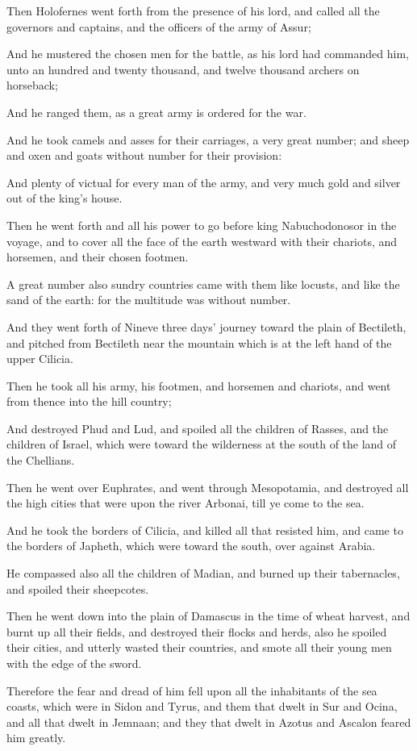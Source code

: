 {\par }{\PP {}Then Holofernes went forth from the presence of his lord, and called all the governors and captains, and the officers of the army of Assur;
\par }{\PP {}And he mustered the chosen men for the battle, as his lord had commanded him, unto an hundred and twenty thousand, and twelve thousand archers on horseback;
\par }{\PP {}And he ranged them, as a great army is ordered for the war.
\par }{\PP {}And he took camels and asses for their carriages, a very great number; and sheep and oxen and goats without number for their provision:
\par }{\PP {}And plenty of victual for every man of the army, and very much gold and silver out of the king’s house.
\par }{\PP {}Then he went forth and all his power to go before king Nabuchodonosor in the voyage, and to cover all the face of the earth westward with their chariots, and horsemen, and their chosen footmen.
\par }{\PP {}A great number also sundry countries came with them like locusts, and like the sand of the earth: for the multitude was without number.
\par }{\PP {}And they went forth of Nineve three days’ journey toward the plain of Bectileth, and pitched from Bectileth near the mountain which is at the left hand of the upper Cilicia.
\par }{\PP {}Then he took all his army, his footmen, and horsemen and chariots, and went from thence into the hill country;
\par }{\PP {}And destroyed Phud and Lud, and spoiled all the children of Rasses, and the children of Israel, which were toward the wilderness at the south of the land of the Chellians.
\par }{\PP {}Then he went over Euphrates, and went through Mesopotamia, and destroyed all the high cities that were upon the river Arbonai, till ye come to the sea.
\par }{\PP {}And he took the borders of Cilicia, and killed all that resisted him, and came to the borders of Japheth, which were toward the south, over against Arabia.
\par }{\PP {}He compassed also all the children of Madian, and burned up their tabernacles, and spoiled their sheepcotes.
\par }{\PP {}Then he went down into the plain of Damascus in the time of wheat harvest, and burnt up all their fields, and destroyed their flocks and herds, also he spoiled their cities, and utterly wasted their countries, and smote all their young men with the edge of the sword.
\par }{\PP {}Therefore the fear and dread of him fell upon all the inhabitants of the sea coasts, which were in Sidon and Tyrus, and them that dwelt in Sur and Ocina, and all that dwelt in Jemnaan; and they that dwelt in Azotus and Ascalon feared him greatly.

}
